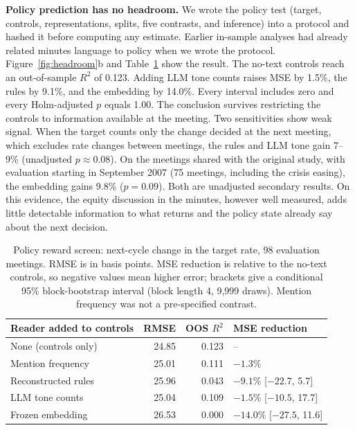 \documentclass[sigconf]{acmart}
\begin{document}
\textbf{Policy prediction has no headroom.} We wrote the policy test (target, controls, representations, splits, five contrasts, and inference) into a protocol and hashed it before computing any estimate. Earlier in-sample analyses had already related minutes language to policy when we wrote the protocol. Figure~\ref{fig:headroom}b and Table~\ref{tab:policy} show the result. The no-text controls reach an out-of-sample $R^2$ of 0.123. Adding LLM tone counts raises MSE by 1.5\%, the rules by 9.1\%, and the embedding by 14.0\%. Every interval includes zero and every Holm-adjusted $p$ equals 1.00. The conclusion survives restricting the controls to information available at the meeting. Two sensitivities show weak signal. When the target counts only the change decided at the next meeting, which excludes rate changes between meetings, the rules and LLM tone gain 7--9\% (unadjusted $p\approx0.08$). On the meetings shared with the original study, with evaluation starting in September 2007 (75 meetings, including the crisis easing), the embedding gains 9.8\% ($p=0.09$). Both are unadjusted secondary results. On this evidence, the equity discussion in the minutes, however well measured, adds little detectable information to what returns and the policy state already say about the next decision.

\begin{table}[t]
\caption{Policy reward screen: next-cycle change in the target rate, 98 evaluation meetings. RMSE is in basis points. MSE reduction is relative to the no-text controls, so negative values mean higher error; brackets give a conditional 95\% block-bootstrap interval (block length 4, 9,999 draws). Mention frequency was not a pre-specified contrast.}
\label{tab:policy}
\small
\begin{tabular}{@{}lrrl@{}}
\toprule
Reader added to controls & RMSE & OOS $R^2$ & MSE reduction \\
\midrule
None (controls only) & 24.85 & 0.123 & -- \\
Mention frequency & 25.01 & 0.111 & $-1.3\%$ \\
Reconstructed rules & 25.96 & 0.043 & $-9.1\%$ [$-22.7$, 5.7] \\
LLM tone counts & 25.04 & 0.109 & $-1.5\%$ [$-10.5$, 17.7] \\
Frozen embedding & 26.53 & 0.000 & $-14.0\%$ [$-27.5$, 11.6] \\
\bottomrule
\end{tabular}
\end{table}
\end{document}
